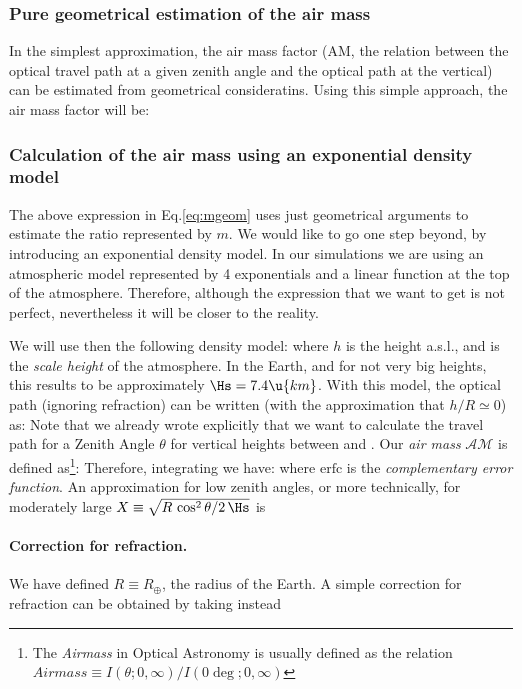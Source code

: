 \subsubsection{Pure geometrical estimation of the air mass}

In the simplest approximation, the air mass factor (AM, the relation
between the optical travel path at a given zenith angle and the
optical path at the vertical) can be estimated from geometrical
consideratins. Using this simple approach, the air mass factor will
be:
%
\mgeomeq

\subsubsection{Calculation of the air mass using an 
exponential density model}

The above expression in Eq.\eqref{eq:mgeom} uses just geometrical
arguments to estimate the ratio represented by $m$. We would like to
go one step beyond, by introducing an exponential density model. In
our simulations we are using an atmospheric model represented by 4
exponentials and a linear function at the top of the atmosphere.
Therefore, although the expression that we want to get is not perfect,
nevertheless it will be closer to the reality.

We will use then the following density model:
%
\denseq
%
where $h$ is the height a.s.l., and \Hs is the \emph{scale height} of
the atmosphere. In the Earth, and for not very big heights, this
results to be approximately $\Hs = 7.4\u{km}$. With this model, the
optical path (ignoring refraction) can be written (with the
approximation that $h/R \simeq 0$) as:
%
\optpathredeq
%
Note that we already wrote explicitly that we want to calculate the
travel path for a Zenith Angle $\theta$ for vertical heights between
\ho and \hv. Our \emph{air mass} $\mathcal{AM}$ is defined
as\footnote{The \emph{Airmass} in Optical Astronomy is usually defined
  as the relation $\mathit{Airmass} \equiv
  {I(\theta;0,\infty)}/{I(0\deg;0,\infty)} $}:
%
\AMdefeq
%
Therefore, integrating we have:
%
\AMfulleq
%
where $\mathrm{erfc}$ is the \emph{complementary error function}. An
approximation for low zenith angles, or more technically, for
moderately large $X\equiv\sqrt{{R\,\cos^2\theta}/{2\,\Hs}}$ is
%
\AMapproxeq

\paragraph{Correction for refraction.} We have defined $R \equiv
R_\oplus$, the radius of the Earth. A simple correction for refraction
can be obtained by taking instead
%

